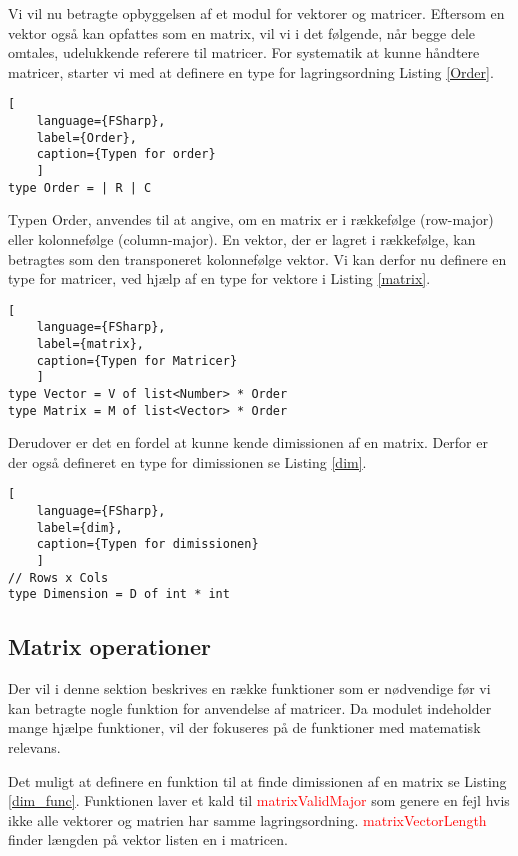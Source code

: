 
Vi vil nu betragte opbyggelsen af et modul for vektorer og matricer. Eftersom en vektor også kan opfattes som en matrix, vil vi i det følgende, når begge dele omtales, udelukkende referere til matricer. For systematik at kunne håndtere matricer, starter vi med at definere en type for lagringsordning Listing \ref{Order}.

\begin{lstlisting}[
    language={FSharp}, 
    label={Order}, 
    caption={Typen for order}
    ]
type Order = | R | C
\end{lstlisting}

Typen Order, anvendes til at angive, om en matrix er i rækkefølge (row-major) eller kolonnefølge (column-major). En vektor, der er lagret i rækkefølge, kan betragtes som den transponeret kolonnefølge vektor. Vi kan derfor nu definere en type for matricer, ved hjælp af en type for vektore i Listing \ref{matrix}.

\begin{lstlisting}[
    language={FSharp}, 
    label={matrix}, 
    caption={Typen for Matricer}
    ]
type Vector = V of list<Number> * Order
type Matrix = M of list<Vector> * Order
\end{lstlisting}

Derudover er det en fordel at kunne kende dimissionen af en matrix. Derfor er der også defineret en type for dimissionen se Listing \ref{dim}.

\begin{lstlisting}[
    language={FSharp}, 
    label={dim}, 
    caption={Typen for dimissionen}
    ]
// Rows x Cols
type Dimension = D of int * int
\end{lstlisting}


\subsection{Matrix operationer}
Der vil i denne sektion beskrives en række funktioner som er nødvendige før vi kan betragte nogle funktion for anvendelse af matricer. Da modulet indeholder mange hjælpe funktioner, vil der fokuseres på de funktioner med matematisk relevans.

Det muligt at definere en funktion til at finde dimissionen af en matrix se Listing \ref{dim_func}. Funktionen laver et kald til \textcolor{red}{matrixValidMajor} som genere en fejl hvis ikke alle vektorer og matrien har samme lagringsordning. \textcolor{red}{matrixVectorLength} finder længden på vektor listen en i matricen.

